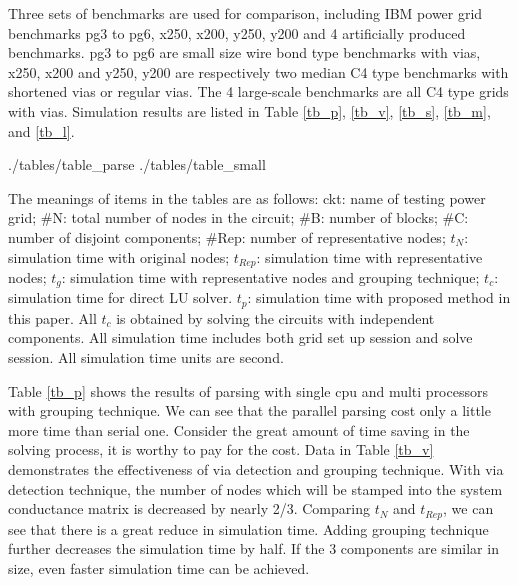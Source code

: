 \documentclass{sig-alternate}
\begin{document}
	Three sets of benchmarks are used for comparison, including 
	IBM power grid benchmarks pg3 to pg6, x250, x200, y250, y200 and 4 artificially produced benchmarks. pg3 to pg6 are 
	small size wire bond type benchmarks with vias, x250, x200 and y250, y200 are respectively two median C4 type benchmarks with
	shortened vias or regular vias. The 4 large-scale benchmarks are all C4 type grids with vias. Simulation results are 
	listed in Table \ref{tb_p}, \ref{tb_v}, \ref{tb_s}, \ref{tb_m}, and \ref{tb_l}.
	\begin{table}[h]
	\vspace{0in}
	   {./tables/table_parse} \label{tb_p}
	   \label{tb_v}
  	   {./tables/table_small} \label{tb_s}
	\end{table}
	\begin{table}[h]
	\vspace{0in}
  	   \label{tb_m}
  	   \label{tb_l}
	\end{table}
	The meanings of items in the tables are as follows: ckt: name of testing power grid; \#N: total number of nodes in the circuit; 
	\#B: number of blocks; \#C: number of disjoint components; \#Rep: number of representative nodes; 
  	$t_N$: simulation time with original nodes; $t_{Rep}$: simulation time with representative nodes; 
	$t_g$: simulation time with representative nodes and grouping technique; $t_c$: simulation time for direct LU solver. 
	$t_p$: simulation time with proposed method in this paper.  
	All $t_c$ is obtained by solving the circuits with independent components. All 
	simulation time includes both grid set up session and solve session. All simulation time units are second.

	Table \ref{tb_p} shows the results of parsing with single cpu and multi processors with grouping technique. We can see that the
	parallel parsing cost only a little more time than serial one. Consider the great amount of time saving in the solving process,
	it is worthy to pay for the cost. 
	Data in Table \ref{tb_v} demonstrates the effectiveness of via detection and grouping technique. With via detection 
	technique, the 
	number of nodes which will be stamped into the system conductance matrix is decreased by nearly 2/3. Comparing $t_N$ 
	and $t_{Rep}$, we can see that there is a
	great reduce in simulation time. Adding grouping technique further decreases the simulation time by half. If the 3 components are 
	similar in size, even faster simulation time can be achieved.
\end{document}
